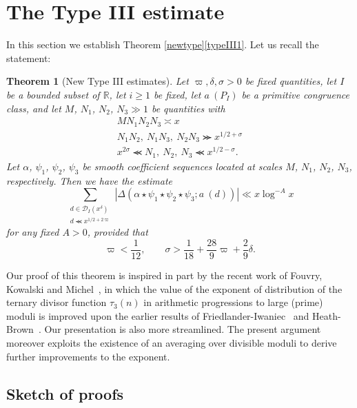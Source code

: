 \documentclass[12pt,a4paper,reqno]{amsart}
\numberwithin{equation}{section}
\theoremstyle{plain}
\newtheorem{theorem}{Theorem}[section]
\theoremstyle{definition}
\newcommand\R{\mathbb{R}}
\newcommand{\DIone}[2]{\mathcal{D}_{{#1}}({#2})}
\renewcommand{\sim}{\asymp}
\renewcommand{\lessapprox}{\llcurly}
\begin{document}
\section{The Type III estimate}\label{typeiii-sec}

In this section we establish Theorem \ref{newtype}\eqref{typeIII1}. Let us 
recall the statement:

\begin{theorem}[New Type III estimates]\label{th-newtypeiii}
  Let $\varpi,\delta,\sigma > 0$ be fixed quantities, 
let $I$ be a bounded subset of $\R$, let $i\geq 1$ be fixed, let $a\
(P_I)$ be a primitive congruence class, and let $M$, $N_1$, $N_2$,
$N_3 \gg 1$ be quantities with
\begin{gather}
\label{eq-x}
MN_1N_2N_3 \sim x\\
\label{eq-long}
N_1N_2,\ N_1N_3,\ N_2N_3\ggcurly x^{1/2+\sigma}
\\
\label{eq-short}
x^{2\sigma}\lessapprox N_1,\ N_2,\ N_3\lessapprox x^{1/2-\sigma}.
\end{gather}
Let $\alpha$, $\psi_1$, $\psi_2$, $\psi_3$ be smooth coefficient
sequences located at scales $M$, $N_1$, $N_2$, $N_3$, respectively.
Then we have the estimate
$$
  \sum_{\substack{d \in \DIone{I}{x^\delta}\\ d \lessapprox
      x^{1/2+2\varpi}}} |\Delta(\alpha \star \psi_1\star\psi_2\star \psi_3; a\ (d))|
  \ll x \log^{-A} x
$$
for any fixed $A>0$, provided that
\begin{equation}\label{eq-iii-cond}
  \varpi<\frac{1}{12},\quad\quad \sigma>\frac{1}{18}+\frac{28}{9}
  \varpi + \frac{2}{9}\delta.
\end{equation}
\end{theorem}

Our proof of this theorem is inspired in part by the recent work of Fouvry, Kowalski
and Michel~\cite{FKM3}, in which the value of the exponent of
distribution of the ternary divisor function $\tau_3(n)$ in arithmetic
progressions to large (prime) moduli is improved upon the earlier
results of Friedlander-Iwaniec~\cite{fik-3} and
Heath-Brown~\cite{hb-d3}. Our presentation is also more streamlined. 
The present argument moreover exploits the existence of an
averaging over divisible moduli to derive further improvements to the
exponent.

\subsection{Sketch of proofs}
\end{document}
